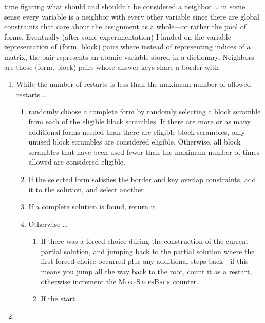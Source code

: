 \documentclass[11pt]{article}
\begin{document}
time figuring what should and shouldn't be considered a neighbor \dots
in some sense every variable is a neighbor with every other variable
since there are global constraints that care about the assignment as a
whole---or rather the pool of forms.  Eventually (after some
experimentation) I landed on the variable representation of (form,
block) pairs where instead of representing indices of a matrix, the
pair represents an atomic variable stored in a dictionary.  Neighbors
are those (form, block) pairs whose answer keys share a border with
\begin{enumerate}
\item While the number of restarts is less than the maximum number of
  allowed restarts \dots
  \begin{enumerate}
  \item randomly choose a complete form by randomly selecting a block
    scramble from each of the eligible block scrambles. If there are
    more or as many additional forms needed than there are eligible
    block scrambles, only unused block scrambles are considered
    eligible.  Otherwise, all block scrambles that have been used
    fewer than the maximum number of times allowed are considered
    eligible.
  \item If the selected form satisfies the border and key overlap
    constraints, add it to the solution, and select another
  \item If a complete solution is found, return it
  \item Otherwise \dots
    \begin{enumerate}
    \item If there was a forced choice during the construction of the
      current partial solution, and jumping back to the partial
      solution where the first forced choice occurred plus any
      additional steps back---if this means you jump all the way back
      to the root, count it as a restart, otherwise increment the
      \textsc{MoreStepsBack} counter.
    \item If the start
    \end{enumerate}
  \end{enumerate}
\item
\end{enumerate}
\end{document}
